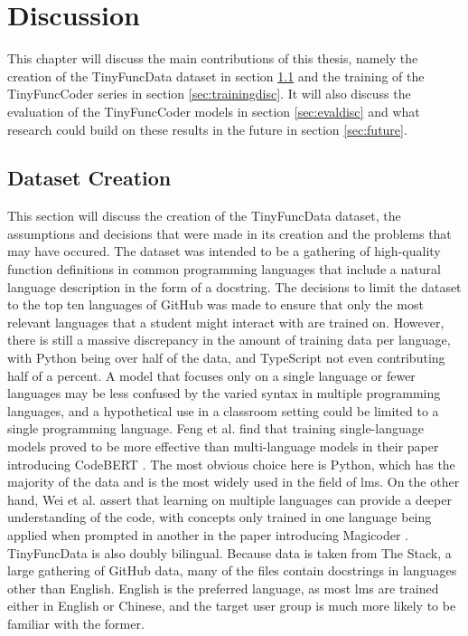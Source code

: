 \chapter{Discussion}
\label{chap:discussion}
This chapter will discuss the main contributions of this thesis, namely the creation of the TinyFuncData dataset in section \ref{sec:datadisc} and the training of the TinyFuncCoder series in section \ref{sec:trainingdisc}.
It will also discuss the evaluation of the TinyFuncCoder models in section \ref{sec:evaldisc} and what research could build on these results in the future in section \ref{sec:future}.

\section{Dataset Creation}
\label{sec:datadisc}
This section will discuss the creation of the TinyFuncData dataset, the assumptions and decisions that were made in its creation and the problems that may have occured.
The dataset was intended to be a gathering of high-quality function definitions in common programming languages that include a natural language description in the form of a docstring.
The decisions to limit the dataset to the top ten languages of GitHub was made to ensure that only the most relevant languages that a student might interact with are trained on.
However, there is still a massive discrepancy in the amount of training data per language, with Python being over half of the data, and TypeScript not even contributing half of a percent.
A model that focuses only on a single language or fewer languages may be less confused by the varied syntax in multiple programming languages, and a hypothetical use in a classroom setting could be limited to a single programming language.
Feng et al. find that training single-language models proved to be more effective than multi-language models in their paper introducing CodeBERT \cite{Feng.19.02.2020}.
The most obvious choice here is Python, which has the majority of the data and is the most widely used in the field of \acp{lm}.
On the other hand, Wei et al. assert that learning on multiple languages can provide a deeper understanding of the code, with concepts only trained in one language being applied when prompted in another in the paper introducing Magicoder \cite{Wei.2024}.
TinyFuncData is also doubly bilingual.
Because data is taken from The Stack, a large gathering of GitHub data, many of the files contain docstrings in languages other than English.
English is the preferred language, as most \acp{lm} are trained either in English or Chinese, and the target user group is much more likely to be familiar with the former.
